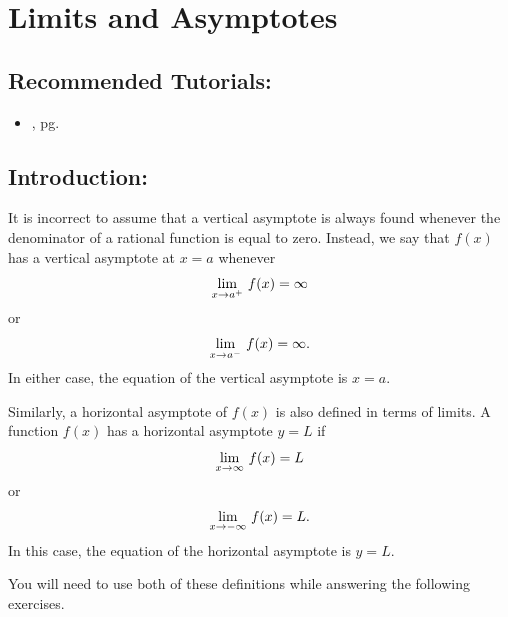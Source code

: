 \section{Limits and Asymptotes}	
\label{sec:limits_and_asymptotes}	

\subsection*{Recommended Tutorials:}
\begin{itemize}[noitemsep]
	\item {}, pg. \pageref{chp:limits}
\end{itemize}

\subsection*{Introduction:}

It is incorrect to assume that a vertical asymptote is always found whenever the denominator of a rational function is equal to zero. Instead, we say that $f(x)$ has a vertical asymptote at $x=a$ whenever
\[ \displaystyle\lim_{x\rightarrow a^+}\, f(x) = \infty \]
or
\[ \displaystyle\lim_{x\rightarrow a^-}\, f(x) = \infty. \]
In either case, the equation of the vertical asymptote is $x=a$.

Similarly, a horizontal asymptote of $f(x)$ is also defined in terms of limits. A function $f(x)$ has a horizontal asymptote $y = L$ if
\[ \displaystyle\lim_{x\rightarrow \infty}\, f(x) = L \]
or
\[ \displaystyle\lim_{x\rightarrow -\infty}\, f(x) = L. \]
In this case, the equation of the horizontal asymptote is $y=L$.

You will need to use both of these definitions while answering the following exercises.


